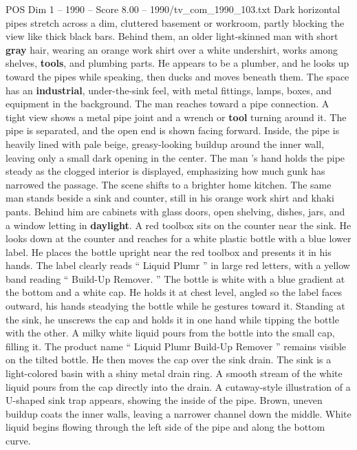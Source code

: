 \begin{textsample}{POS Dim 1 – 1990 – Score 8.00 – 1990/tv\_com\_1990\_103.txt}  \label{ex:f1_pos_049}
Dark horizontal pipes stretch across a dim, cluttered basement or workroom, partly blocking the view like thick black bars.
Behind them, an older light-skinned man with short \textbf{gray} hair, wearing an orange work shirt over a white undershirt, works among shelves, \textbf{tools}, and plumbing parts.
He appears to be a plumber, and he looks up toward the pipes while speaking, then ducks and moves beneath them.
The space has an \textbf{industrial}, under-the-sink feel, with metal fittings, lamps, boxes, and equipment in the background.
The man reaches toward a pipe connection.
A tight view shows a metal pipe joint and a wrench or \textbf{tool} turning around it.
The pipe is separated, and the open end is shown facing forward.
Inside, the pipe is heavily lined with pale beige, greasy-looking buildup around the inner wall, leaving only a small dark opening in the center.
The man ’s hand holds the pipe steady as the clogged interior is displayed, emphasizing how much gunk has narrowed the passage.
The scene shifts to a brighter home kitchen.
The same man stands beside a sink and counter, still in his orange work shirt and khaki pants.
Behind him are cabinets with glass doors, open shelving, dishes, jars, and a window letting in \textbf{daylight}.
A red toolbox sits on the counter near the sink.
He looks down at the counter and reaches for a white plastic bottle with a blue lower label.
He places the bottle upright near the red toolbox and presents it in his hands.
The label clearly reads “ Liquid Plumr ” in large red letters, with a yellow band reading “ Build-Up Remover. ” The bottle is white with a blue gradient at the bottom and a white cap.
He holds it at chest level, angled so the label faces outward, his hands steadying the bottle while he gestures toward it.
Standing at the sink, he unscrews the cap and holds it in one hand while tipping the bottle with the other.
A milky white liquid pours from the bottle into the small cap, filling it.
The product name “ Liquid Plumr Build-Up Remover ” remains visible on the tilted bottle.
He then moves the cap over the sink drain.
The sink is a light-colored basin with a shiny metal drain ring.
A smooth stream of the white liquid pours from the cap directly into the drain.
A cutaway-style illustration of a U-shaped sink trap appears, showing the inside of the pipe.
Brown, uneven buildup coats the inner walls, leaving a narrower channel down the middle.
White liquid begins flowing through the left side of the pipe and along the bottom curve.

\end{textsample}
